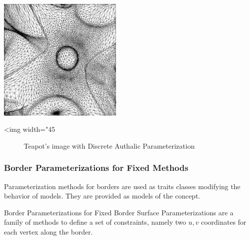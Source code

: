 \begin{center}
    \label{Surface_mesh_parameterization-fig-authalic_2}
    \begin{ccTexOnly}
        \includegraphics[width=0.45\textwidth]{Surface_mesh_parameterization/authalic_2}
    \end{ccTexOnly}
    \begin{ccHtmlOnly}
        <img width="45%
    \end{ccHtmlOnly}
    \begin{figure}[h]
        \caption{Teapot's image with Discrete Authalic Parameterization}
    \end{figure}
\end{center}


\subsubsection{Border Parameterizations for Fixed Methods}
\label{sec:Border-Parameterizations-for-Fixed-Methods}

Parameterization methods for
borders are used as traits classes modifying the behavior of
 models.
They are provided as models of the  concept.

Border Parameterizations for Fixed Border Surface Parameterizations
are a family of methods to define a set of constraints, namely two
$u,v$ coordinates for each vertex along the border.


